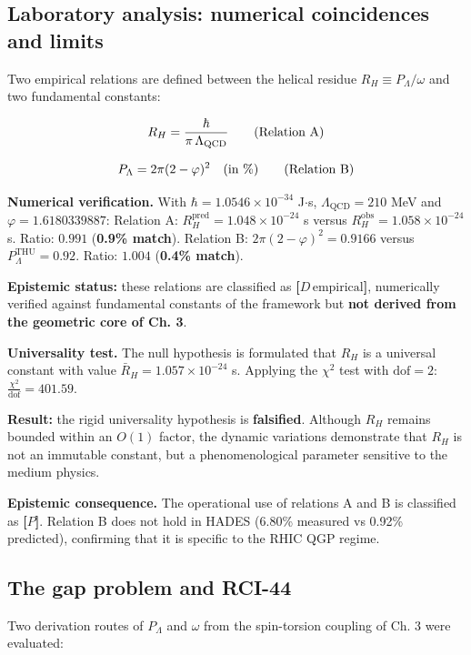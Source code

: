﻿\documentclass[11pt,letterpaper]{article}
\begin{document}
\subsection{Laboratory analysis: numerical coincidences and limits}
Two empirical relations are defined between the helical residue $R_H \equiv P_\Lambda / \omega$ and two fundamental constants:

\begin{equation*}
  \resizebox{\ifdim\width>\linewidth \linewidth\else\width\fi}{!}{$\displaystyle R_H = \frac{\hbar}{\pi \, \Lambda_{\text{QCD}}} \qquad \text{(Relation A)}$}
\end{equation*}

\begin{equation*}
  \resizebox{\ifdim\width>\linewidth \linewidth\else\width\fi}{!}{$\displaystyle P_\Lambda = 2\pi (2-\varphi)^2 \quad \text{(in \%)} \qquad \text{(Relation B)}$}
\end{equation*}

\textbf{Numerical verification.} With $\hbar = 1.0546\times 10^{-34}$ J$\cdot$s, $\Lambda_{\text{QCD}} = 210$ MeV and $\varphi = 1.6180339887$: Relation A: $R_H^{\text{pred}} = 1.048\times 10^{-24}$ s versus $R_H^{\text{obs}} = 1.058\times 10^{-24}$ s. Ratio: $0.991$ (\textbf{0.9\% match}). Relation B: $2\pi(2-\varphi)^2 = 0.9166$ versus $P_\Lambda^{\text{THU}} = 0.92$. Ratio: $1.004$ (\textbf{0.4\% match}).

\textbf{Epistemic status:} these relations are classified as \textbf{[$D\,\text{empirical}$]}, numerically verified against fundamental constants of the framework but \textbf{not derived from the geometric core of Ch. 3}.

\textbf{Universality test.} The null hypothesis is formulated that $R_H$ is a universal constant with value $\bar{R}_H = 1.057\times 10^{-24}$ s. Applying the $\chi^2$ test with $\mathrm{dof} = 2$: $\frac{\chi^2}{\mathrm{dof}} = 401.59$.

\textbf{Result:} the rigid universality hypothesis is \textbf{falsified}. Although $R_H$ remains bounded within an $O(1)$ factor, the dynamic variations demonstrate that $R_H$ is not an immutable constant, but a phenomenological parameter sensitive to the medium physics.

\textbf{Epistemic consequence.} The operational use of relations A and B is classified as \textbf{[$P$]}. Relation B does not hold in HADES (6.80\% measured vs 0.92\% predicted), confirming that it is specific to the RHIC QGP regime.
\subsection{The gap problem and RCI-44}
Two derivation routes of $P_\Lambda$ and $\omega$ from the spin-torsion coupling of Ch. 3 were evaluated:
\end{document}
